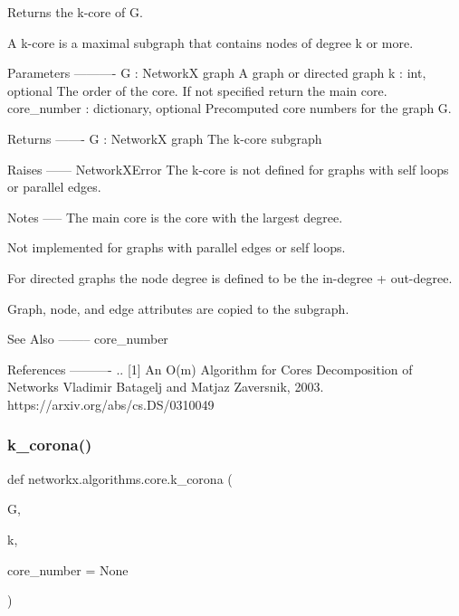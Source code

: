 \begin{DoxyVerb}Returns the k-core of G.

A k-core is a maximal subgraph that contains nodes of degree k or more.

Parameters
----------
G : NetworkX graph
  A graph or directed graph
k : int, optional
  The order of the core.  If not specified return the main core.
core_number : dictionary, optional
  Precomputed core numbers for the graph G.

Returns
-------
G : NetworkX graph
  The k-core subgraph

Raises
------
NetworkXError
  The k-core is not defined for graphs with self loops or parallel edges.

Notes
-----
The main core is the core with the largest degree.

Not implemented for graphs with parallel edges or self loops.

For directed graphs the node degree is defined to be the
in-degree + out-degree.

Graph, node, and edge attributes are copied to the subgraph.

See Also
--------
core_number

References
----------
.. [1] An O(m) Algorithm for Cores Decomposition of Networks
   Vladimir Batagelj and Matjaz Zaversnik,  2003.
   https://arxiv.org/abs/cs.DS/0310049
\end{DoxyVerb}
 \mbox{\label{namespacenetworkx_1_1algorithms_1_1core_a57daef16204b88cd4c7a0057cff9c2f8}} 
\subsubsection{\texorpdfstring{k\+\_\+corona()}{k\_corona()}}
{\footnotesize\ttfamily def networkx.\+algorithms.\+core.\+k\+\_\+corona (\begin{DoxyParamCaption}\item[{}]{G,  }\item[{}]{k,  }\item[{}]{core\+\_\+number = {\ttfamily None} }\end{DoxyParamCaption})}

